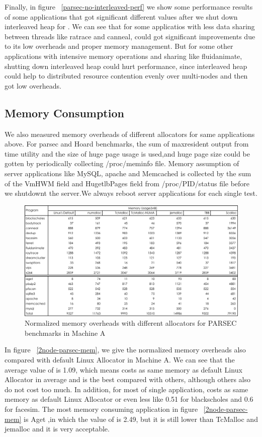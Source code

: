Finally, in figure ~\ref{parsec-no-interleaved-perf} we show some performance results of some applications that got significant different values after we shut down interleaved heap for \NM{}. We can see that for some applicatios with less data sharing between threads like ratrace and canneal, \NM{} could got significant improvements due to its low overheads and proper memory management. But for some other applications with intensive memory operations and sharing like fluidanimate, shutting down interleaved heap could hurt performance, since interleaved heap could help to distributed resource contention evenly over multi-nodes and then got low overheads.

\subsection{Memory Consumption}
\label{sec:memory}

We also measured memory overheads of different allocators for same applications above. For parsec and Hoard benchmarks, the sum of maxresident output from time utility and the size of huge page usage is used,and huge page size could be gotten by periodically collecting /proc/meminfo file. Memory assumption of server applications like MySQL, apache and Memcached is collected by the sum of the VmHWM field and HugetlbPages field from /proc/PID/status file before we shutdownt the server.We always reboot server applications for each single test. 

\begin{figure}[H]
    \centering
    \includegraphics[width=\textwidth]{figure/8-node-memory.pdf}
    \caption{Normalized memory overheads with different allocators for PARSEC benchmarks in Machine A}
    \label{8node-parsec-mem}
\end{figure}

In figure ~\ref{2node-parsec-mem}, we give the normalized memory overheads also compared with default Linux Allocator in Machine A. We can see that the average value of \NM{} is 1.09, which means \NM{} costs as same memory as default Linux Allocator in average and \NM{} is the best compared with others, although others also do not cost too much. In addition, for most of single application, \NM{} costs as same memory as default Linux Allocator or even less like 0.51 for blackscholes and 0.6 for facesim. The most memory consuming application in figure ~\ref{2node-parsec-mem} is Aget ,in which the value of \NM{} is 2.49, but it is still lower than TcMalloc and jemalloc and it is very acceptable. 


